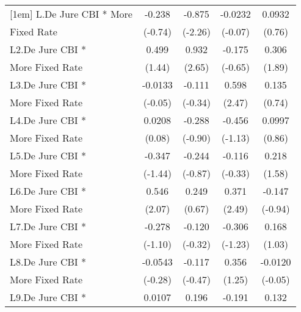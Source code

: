 {\begin{tabular}{l*{4}{c}}
[1em]
L.De Jure CBI * More&      -0.238         &      -0.875\sym{*}  &     -0.0232         &      0.0932         \\
Fixed Rate          &     (-0.74)         &     (-2.26)         &     (-0.07)         &      (0.76)         \\
[1em]
L2.De Jure CBI *    &       0.499         &       0.932\sym{**} &      -0.175         &       0.306         \\
More Fixed Rate     &      (1.44)         &      (2.65)         &     (-0.65)         &      (1.89)         \\
[1em]
L3.De Jure CBI *    &     -0.0133         &      -0.111         &       0.598\sym{*}  &       0.135         \\
More Fixed Rate     &     (-0.05)         &     (-0.34)         &      (2.47)         &      (0.74)         \\
[1em]
L4.De Jure CBI *    &      0.0208         &      -0.288         &      -0.456         &      0.0997         \\
More Fixed Rate     &      (0.08)         &     (-0.90)         &     (-1.13)         &      (0.86)         \\
[1em]
L5.De Jure CBI *    &      -0.347         &      -0.244         &      -0.116         &       0.218         \\
More Fixed Rate     &     (-1.44)         &     (-0.87)         &     (-0.33)         &      (1.58)         \\
[1em]
L6.De Jure CBI *    &       0.546\sym{*}  &       0.249         &       0.371\sym{*}  &      -0.147         \\
More Fixed Rate     &      (2.07)         &      (0.67)         &      (2.49)         &     (-0.94)         \\
[1em]
L7.De Jure CBI *    &      -0.278         &      -0.120         &      -0.306         &       0.168         \\
More Fixed Rate     &     (-1.10)         &     (-0.32)         &     (-1.23)         &      (1.03)         \\
[1em]
L8.De Jure CBI *    &     -0.0543         &      -0.117         &       0.356         &     -0.0120         \\
More Fixed Rate     &     (-0.28)         &     (-0.47)         &      (1.25)         &     (-0.05)         \\
[1em]
L9.De Jure CBI *    &      0.0107         &       0.196         &      -0.191         &       0.132         \\

\end{tabular}}
